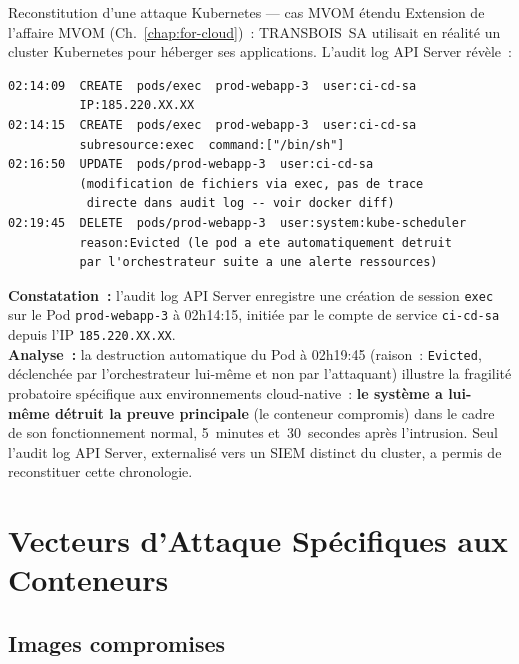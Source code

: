 \begin{boxscenario}{Reconstitution d'une attaque Kubernetes --- cas MVOM étendu}
Extension de l'affaire MVOM (Ch.~\ref{chap:for-cloud})~: TRANSBOIS~SA
utilisait en réalité un cluster Kubernetes pour héberger ses applications.
L'audit log API Server révèle~:

\begin{lstlisting}[language=bash_forensique]
02:14:09  CREATE  pods/exec  prod-webapp-3  user:ci-cd-sa
          IP:185.220.XX.XX
02:14:15  CREATE  pods/exec  prod-webapp-3  user:ci-cd-sa
          subresource:exec  command:["/bin/sh"]
02:16:50  UPDATE  pods/prod-webapp-3  user:ci-cd-sa
          (modification de fichiers via exec, pas de trace
           directe dans audit log -- voir docker diff)
02:19:45  DELETE  pods/prod-webapp-3  user:system:kube-scheduler
          reason:Evicted (le pod a ete automatiquement detruit
          par l'orchestrateur suite a une alerte ressources)
\end{lstlisting}

\textbf{Constatation~:} l'audit log API Server enregistre une
création de session \texttt{exec} sur le Pod \texttt{prod-webapp-3}
à 02h14:15, initiée par le compte de service \texttt{ci-cd-sa}
depuis l'IP \texttt{185.220.XX.XX}.\\[0.3ex]
\textbf{Analyse~:} la destruction automatique du Pod à 02h19:45
(raison~: \texttt{Evicted}, déclenchée par l'orchestrateur
lui-même et non par l'attaquant) illustre la fragilité probatoire
spécifique aux environnements cloud-native~: \textbf{le système
a lui-même détruit la preuve principale} (le conteneur compromis)
dans le cadre de son fonctionnement normal, 5~minutes et~30~secondes
après l'intrusion. Seul l'audit log API Server, externalisé
vers un SIEM distinct du cluster, a permis de reconstituer
cette chronologie.
\end{boxscenario}

\section{Vecteurs d'Attaque Spécifiques aux Conteneurs}
\label{sec:vecteurs-attaque}

\subsection{Images compromises}

